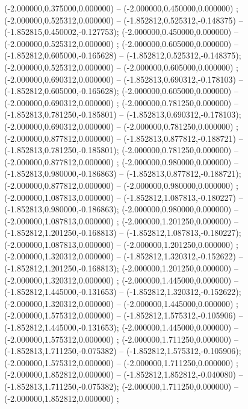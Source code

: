  (-2.000000,0.375000,0.000000) -- (-2.000000,0.450000,0.000000) ;
 (-2.000000,0.525312,0.000000) -- (-1.852812,0.525312,-0.148375) -- (-1.852815,0.450002,-0.127753);
 (-2.000000,0.450000,0.000000) -- (-2.000000,0.525312,0.000000) ;
 (-2.000000,0.605000,0.000000) -- (-1.852812,0.605000,-0.165628) -- (-1.852812,0.525312,-0.148375);
 (-2.000000,0.525312,0.000000) -- (-2.000000,0.605000,0.000000) ;
 (-2.000000,0.690312,0.000000) -- (-1.852813,0.690312,-0.178103) -- (-1.852812,0.605000,-0.165628);
 (-2.000000,0.605000,0.000000) -- (-2.000000,0.690312,0.000000) ;
 (-2.000000,0.781250,0.000000) -- (-1.852813,0.781250,-0.185801) -- (-1.852813,0.690312,-0.178103);
 (-2.000000,0.690312,0.000000) -- (-2.000000,0.781250,0.000000) ;
 (-2.000000,0.877812,0.000000) -- (-1.852813,0.877812,-0.188721) -- (-1.852813,0.781250,-0.185801);
 (-2.000000,0.781250,0.000000) -- (-2.000000,0.877812,0.000000) ;
 (-2.000000,0.980000,0.000000) -- (-1.852813,0.980000,-0.186863) -- (-1.852813,0.877812,-0.188721);
 (-2.000000,0.877812,0.000000) -- (-2.000000,0.980000,0.000000) ;
 (-2.000000,1.087813,0.000000) -- (-1.852812,1.087813,-0.180227) -- (-1.852813,0.980000,-0.186863);
 (-2.000000,0.980000,0.000000) -- (-2.000000,1.087813,0.000000) ;
 (-2.000000,1.201250,0.000000) -- (-1.852812,1.201250,-0.168813) -- (-1.852812,1.087813,-0.180227);
 (-2.000000,1.087813,0.000000) -- (-2.000000,1.201250,0.000000) ;
 (-2.000000,1.320312,0.000000) -- (-1.852812,1.320312,-0.152622) -- (-1.852812,1.201250,-0.168813);
 (-2.000000,1.201250,0.000000) -- (-2.000000,1.320312,0.000000) ;
 (-2.000000,1.445000,0.000000) -- (-1.852812,1.445000,-0.131653) -- (-1.852812,1.320312,-0.152622);
 (-2.000000,1.320312,0.000000) -- (-2.000000,1.445000,0.000000) ;
 (-2.000000,1.575312,0.000000) -- (-1.852812,1.575312,-0.105906) -- (-1.852812,1.445000,-0.131653);
 (-2.000000,1.445000,0.000000) -- (-2.000000,1.575312,0.000000) ;
 (-2.000000,1.711250,0.000000) -- (-1.852813,1.711250,-0.075382) -- (-1.852812,1.575312,-0.105906);
 (-2.000000,1.575312,0.000000) -- (-2.000000,1.711250,0.000000) ;
 (-2.000000,1.852812,0.000000) -- (-1.852812,1.852812,-0.040080) -- (-1.852813,1.711250,-0.075382);
 (-2.000000,1.711250,0.000000) -- (-2.000000,1.852812,0.000000) ;
